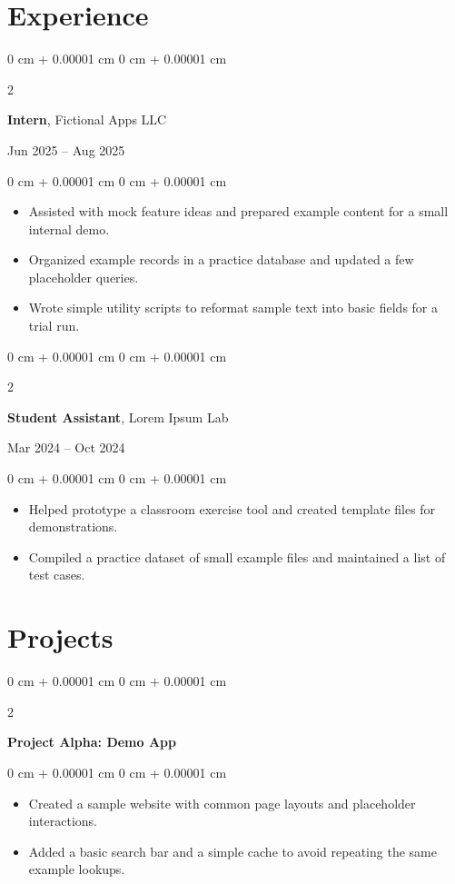 \documentclass[10pt, letterpaper]{article}
\newenvironment{highlights}{
    \begin{itemize}[
        topsep=0.10 cm,
        parsep=0.10 cm,
        partopsep=0pt,
        itemsep=0pt,
        leftmargin=0 cm + 10pt
    ]
}{
    \end{itemize}
} %
\newenvironment{onecolentry}{
    \begin{adjustwidth}{
        0 cm + 0.00001 cm
    }{
        0 cm + 0.00001 cm
    }
}{
    \end{adjustwidth}
} %
\newenvironment{twocolentry}[2][]{
    \onecolentry
    \def\secondColumn{#2}
    \setcolumnwidth{\fill, 7.5 cm}
    \begin{paracol}{2}
}{
    \switchcolumn \raggedleft \secondColumn
    \end{paracol}
    \endonecolentry
} %
\begin{document}
\section{Experience}
\begin{twocolentry}{Jun 2025 -- Aug 2025}
\textbf{Intern}, Fictional Apps LLC
\end{twocolentry}
\vspace{0.1 cm}
\begin{onecolentry}
\begin{highlights}
    \item Assisted with mock feature ideas and prepared example content for a small internal demo.
    \item Organized example records in a practice database and updated a few placeholder queries.
    \item Wrote simple utility scripts to reformat sample text into basic fields for a trial run.
\end{highlights}
\end{onecolentry}

\vspace{0.2 cm}
\begin{twocolentry}{Mar 2024 -- Oct 2024}
\textbf{Student Assistant}, Lorem Ipsum Lab
\end{twocolentry}
\vspace{0.1 cm}
\begin{onecolentry}
\begin{highlights}
    \item Helped prototype a classroom exercise tool and created template files for demonstrations.
    \item Compiled a practice dataset of small example files and maintained a list of test cases.
\end{highlights}
\end{onecolentry}

\section{Projects}

\begin{twocolentry}{}
\textbf{Project Alpha: Demo App}
\end{twocolentry}
\vspace{0.1 cm}
\begin{onecolentry}
\begin{highlights}
    \item Created a sample website with common page layouts and placeholder interactions.
    \item Added a basic search bar and a simple cache to avoid repeating the same example lookups.
\end{highlights}
\end{onecolentry}
\end{document}
